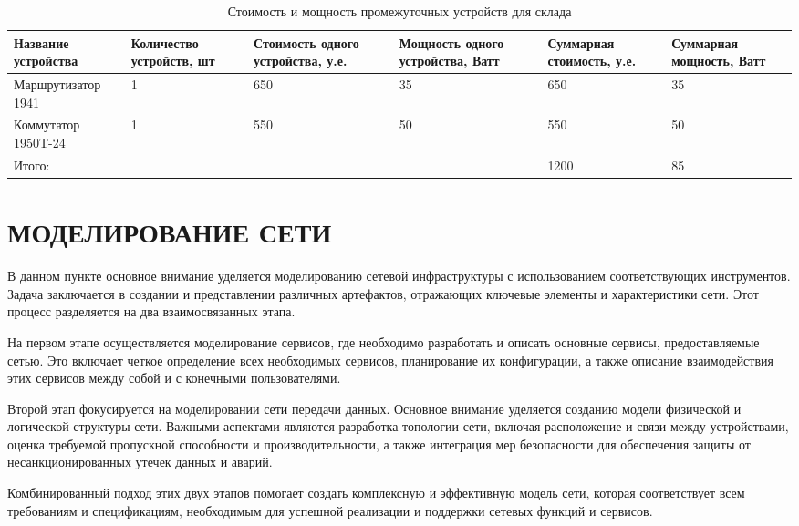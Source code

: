 \begin{table}[H]
\centering
{}
\caption{Стоимость и мощность промежуточных устройств для склада\;\label{table:sk_price_plan}}
\small
\begin{tabularx}{\textwidth}{|p{3cm}|X|X|X|X|X|}
\hline
	Название устройства      & Количество устройств, шт & Стоимость одного устройства, у.е. & Мощность одного устройства, Ватт 	& Суммарная стоимость, у.е. & Суммарная мощность, Ватт 	\\ \hline
	Маршрутизатор 1941		 & 1						& 650								& 35								& 650						& 35						\\ \hline
	Коммутатор 1950T-24		 & 1						& 550								& 50								& 550						& 50						\\ \hline
    \multicolumn{4}{|s|}{Итого:}  & 1200                    & 85 \\ \hline
\end{tabularx}
\end{table}

\section{МОДЕЛИРОВАНИЕ СЕТИ}
В данном пункте основное внимание уделяется моделированию сетевой инфраструктуры с использованием соответствующих инструментов. Задача заключается в создании и представлении различных артефактов, отражающих ключевые элементы и характеристики сети. Этот процесс разделяется на два взаимосвязанных этапа.

На первом этапе осуществляется моделирование сервисов, где необходимо разработать и описать основные сервисы, предоставляемые сетью. Это включает четкое определение всех необходимых сервисов, планирование их конфигурации, а также описание взаимодействия этих сервисов между собой и с конечными пользователями.

Второй этап фокусируется на моделировании сети передачи данных. Основное внимание уделяется созданию модели физической и логической структуры сети. Важными аспектами являются разработка топологии сети, включая расположение и связи между устройствами, оценка требуемой пропускной способности и производительности, а также интеграция мер безопасности для обеспечения защиты от несанкционированных утечек данных и аварий.

Комбинированный подход этих двух этапов помогает создать комплексную и эффективную модель сети, которая соответствует всем требованиям и спецификациям, необходимым для успешной реализации и поддержки сетевых функций и сервисов.


